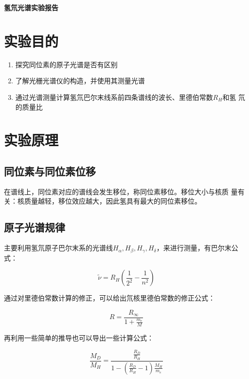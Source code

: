 \documentclass[a4paper,UTF8]{ctexart}
\begin{document}
\begin{center}
    \textbf{\Large 氢氘光谱实验报告}
    \par {}
\end{center}

\section{实验目的}

\begin{enumerate}
    \item 探究同位素的原子光谱是否有区别
    \item 了解光栅光谱仪的构造，并使用其测量光谱
    \item 通过光谱测量计算氢氘巴尔末线系前四条谱线的波长、里德伯常数$R_{H}$和氢
氘的质量比
\end{enumerate}

\section{实验原理}

\subsection{同位素与同位素位移}
在谱线上，同位素对应的谱线会发生移位，称同位素移位。移位大小与核质
量有关：核质量越轻，移位效应越大，因此氢具有最大的同位素移位。
\subsection{原子光谱规律}

主要利用氢氘原子巴尔末系的光谱线$H_{\alpha},H_{\beta},H_{\gamma},H_{\delta}$，来进行测量，有巴尔末公式：

\begin{equation}
    \tilde{\nu} = R_{H} (\frac{1}{2^2}-\frac{1}{n^2})
\end{equation}

通过对里德伯常数计算的修正，可以给出氘核里德伯常数的修正公式：

\begin{equation}
    R = \frac{R_{\infty}}{1+\frac{m_{e}}{M}}
\end{equation}

再利用一些简单的推导也可以导出一些计算公式：

\begin{equation}
    \frac{M_{D}}{M_{H}} = \frac{\frac{R_{D}}{R_{H}}}{1-(\frac{R_{D}}{R_{H}}-1)\frac{M_{H}}{m_{e}}}
\end{equation}
\end{document}
